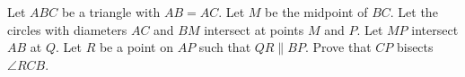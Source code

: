 Let $ABC$ be a triangle with $AB = AC$. Let $M$ be the midpoint of $BC$. Let the circles with diameters $AC$ and $BM$ intersect at points $M$ and $P$. Let $MP$ intersect $AB$ at $Q$. Let $R$ be a point on $AP$ such that $QR \parallel BP$. Prove that $CP$ bisects $\angle RCB$.